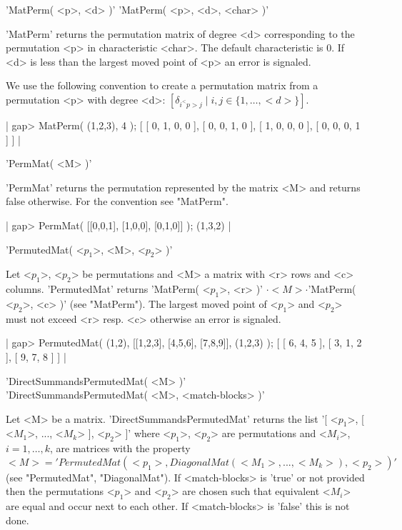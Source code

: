 
'MatPerm( <p>, <d> )'
'MatPerm( <p>, <d>, <char> )'

'MatPerm' returns the permutation matrix of degree <d> 
corresponding to the permutation <p> in characteristic <char>.
The default characteristic is 0. If <d> is less than the largest
moved point of <p> an error is signaled. 

We use the following convention to create a permutation 
matrix from a permutation <p> with degree <d>: 
$[\delta_{i^<p>j}\mid i,j\in\{1,\dots,<d>\}]$.

|    gap> MatPerm( (1,2,3), 4 );
    [ [ 0, 1, 0, 0 ], [ 0, 0, 1, 0 ], [ 1, 0, 0, 0 ], [ 0, 0, 0, 1 ] ] |


'PermMat( <M> )'

'PermMat' returns the permutation represented by the matrix <M>
and returns false otherwise. For the convention see "MatPerm".

|    gap> PermMat( [[0,0,1], [1,0,0], [0,1,0]] );
    (1,3,2) |


'PermutedMat( <$p_1$>, <M>, <$p_2$> )'

Let <$p_1$>, <$p_2$> be permutations and <M> a matrix 
with <r> rows and <c> columns.
'PermutedMat' returns 'MatPerm( <$p_1$>, <r> )'
$\cdot <M>\cdot$'MatPerm( <$p_2$>, <c> )' (see "MatPerm").
The largest moved point of <$p_1$> and <$p_2$> must 
not exceed <r> resp. <c> otherwise an error is signaled.

|    gap> PermutedMat( (1,2), [[1,2,3], [4,5,6], [7,8,9]], (1,2,3) );
    [ [ 6, 4, 5 ], [ 3, 1, 2 ], [ 9, 7, 8 ] ] |


'DirectSummandsPermutedMat( <M> )'\\
'DirectSummandsPermutedMat( <M>, <match-blocks> )'

Let <M> be a matrix. 'DirectSummandsPermutedMat' returns the list 
'[ <$p_1$>, [ <$M_1$>, ..., <$M_k$> ], <$p_2$> ]' where 
<$p_1$>, <$p_2$> are permutations and <$M_i$>, $i = 1,\dots,k$, are 
matrices with the property 
$<M> = 'PermutedMat( <p_1>, DiagonalMat( <M_1>, ..., <M_k> ), 
<p_2> )'$ (see "PermutedMat", "DiagonalMat").
If <match-blocks> is 'true' or not provided then the permutations
<$p_1$> and <$p_2$> are chosen such that equivalent <$M_i$>
are equal and occur next to each other.
If <match-blocks> is 'false' this is not done.

